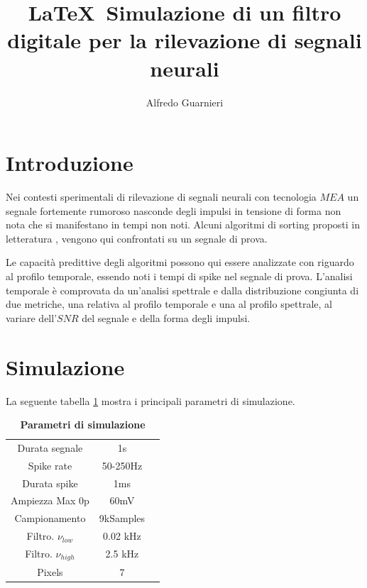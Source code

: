 \documentclass[9pt,twocolumn,twoside]{osajnl}
\title{\LaTeX\  Simulazione di un filtro digitale per la rilevazione di segnali neurali \emph{ }}
\author[1]{Alfredo Guarnieri}
\begin{document}
\maketitle



\section{Introduzione}

Nei contesti sperimentali di rilevazione di segnali neurali con tecnologia $MEA$ un segnale fortemente rumoroso nasconde degli impulsi in tensione di forma non nota che si manifestano in tempi non noti. Alcuni algoritmi di sorting proposti in letteratura
\cite{Vallicelli2017}, \cite{Lambacher2011} vengono  qui confrontati su un segnale di prova.

Le capacità predittive degli algoritmi possono qui essere analizzate con riguardo al profilo temporale, essendo noti i tempi di spike nel segnale di prova. L'analisi temporale è comprovata da un'analisi spettrale e dalla distribuzione congiunta di due metriche, una relativa al profilo temporale e una al profilo spettrale, al variare dell'$SNR$ del segnale e della forma degli impulsi.


% 



\section{Simulazione}
\label{sec:examples}

La seguente tabella \ref{tab:param} mostra i principali parametri di simulazione.

\begin{table}[htbp]
\centering
\caption{\bf Parametri di simulazione}
\begin{tabular}{ccc}
\hline
Durata segnale       & 1s        \\
Spike rate           & 50-250Hz      \\
Durata spike         & 1ms       \\
Ampiezza Max 0p      & 60mV      \\
Campionamento        & 9kSamples \\
Filtro. $\nu_{low}$  & 0.02 kHz   \\
Filtro. $\nu_{high}$ & 2.5 kHz   \\
Pixels               & 7         \\
\hline
\end{tabular}
\label{tab:param}
\end{table}
\end{document}
